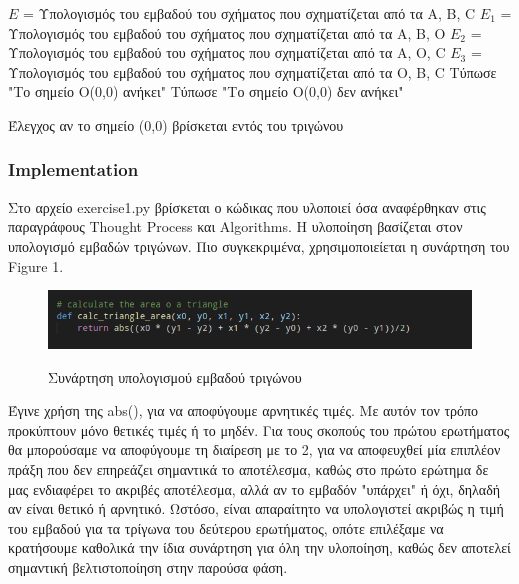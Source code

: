 \documentclass[12pt]{article}
\newenvironment{matlab}
	{\begin{figure}[H]\centering\captionsetup{justification=centering}}
	{\end{figure}}
\begin{document}
\begin{algorithm}[H]
	\SetAlgoLined

	\(E\) = Υπολογισμός του εμβαδού του σχήματος που σχηματίζεται από τα A, B, C \;
	\(E_1\) = Υπολογισμός του εμβαδού του σχήματος που σχηματίζεται από τα A, B, O \;
	\(E_2\) = Υπολογισμός του εμβαδού του σχήματος που σχηματίζεται από τα A, O, C \;
	\(E_3\) = Υπολογισμός του εμβαδού του σχήματος που σχηματίζεται από τα O, B, C \;
	{Τύπωσε "Το σημείο O(0,0) ανήκει" \;}
	{Τύπωσε "Το σημείο O(0,0) δεν ανήκει" \;}

	\caption{Έλεγχος αν το σημείο (0,0) βρίσκεται εντός του τριγώνου}
\end{algorithm}

\subsubsection*{Implementation}

Στο αρχείο exercise1.py βρίσκεται ο κώδικας που υλοποιεί όσα αναφέρθηκαν στις παραγράφους Thought Process και Algorithms. Η υλοποίηση βασίζεται στον υπολογισμό εμβαδών τριγώνων. Πιο συγκεκριμένα, χρησιμοποιείεται η συνάρτηση του Figure 1. \\

\begin{matlab}
	\includegraphics[scale=0.6]{images/exercise1_impl.png}
  	\caption{Συνάρτηση υπολογισμού εμβαδού τριγώνου}
\end{matlab}

Έγινε χρήση της abs(), για να αποφύγουμε αρνητικές τιμές. Με αυτόν τον τρόπο προκύπτουν μόνο θετικές τιμές ή το μηδέν. Για τους σκοπούς του πρώτου ερωτήματος θα μπορούσαμε να αποφύγουμε τη διαίρεση με το 2, για να αποφευχθεί μία επιπλέον πράξη που δεν επηρεάζει σημαντικά το αποτέλεσμα, καθώς στο πρώτο ερώτημα δε μας ενδιαφέρει το ακριβές αποτέλεσμα, αλλά αν το εμβαδόν "υπάρχει" ή όχι, δηλαδή αν είναι θετικό ή αρνητικό. Ωστόσο, είναι απαραίτητο να υπολογιστεί ακριβώς η τιμή του εμβαδού για τα τρίγωνα του δεύτερου ερωτήματος, οπότε επιλέξαμε να κρατήσουμε καθολικά την ίδια συνάρτηση για όλη την υλοποίηση, καθώς δεν αποτελεί σημαντική βελτιστοποίηση στην παρούσα φάση. \\
\end{document}
